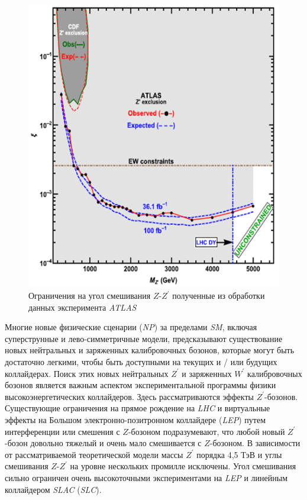 \begin{figure}[!h]
	\centering
	\includegraphics[width=\textwidth]{figures/verify-1.png}
	\caption{Ограничения на угол смешивания $Z$-${Z}^{\prime}$ полученные из обработки данных эксперимента \textit{ATLAS}~\cite{2part-pankov}}
	\label{fig:verify-1}
\end{figure}

Многие новые физические сценарии (\textit{NP}) за пределами \textit{SM}, включая суперструнные и лево-симметричные модели, предсказывают существование новых нейтральных и заряженных калибровочных бозонов, которые могут быть достаточно легкими, чтобы быть доступными на текущих и / или будущих коллайдерах. Поиск этих новых нейтральных ${Z}^{\prime}$ и заряженных ${W}^{\prime}$ калибровочных бозонов является важным аспектом экспериментальной программы физики высокоэнергетических коллайдеров. Здесь рассматриваются  эффекты ${Z}^{\prime}$-бозонов. Существующие ограничения на прямое рождение на \textit{LHC} и виртуальные эффекты на Большом электронно-позитронном коллайдере (\textit{LEP}) путем интерференции или смешения с $Z$-бозоном подразумевают, что любой новый ${Z}^{\prime}$-бозон довольно тяжелый и очень мало смешивается с $Z$-бозоном. В зависимости от рассматриваемой теоретической модели массы ${Z}^{\prime}$ порядка 4,5 ТэВ и углы смешивания $Z$-${Z}^{\prime}$ на уровне нескольких промилле исключены. Угол смешивания сильно ограничен очень высокоточными экспериментами на \textit{LEP} и линейным коллайдером \textit{SLAC} (\textit{SLC}).

